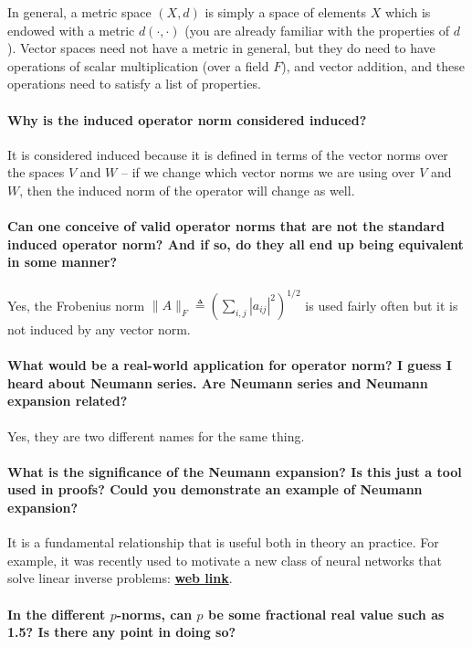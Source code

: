 \documentclass[10pt,english]{article}
\begin{document}
In general, a metric space $(X,d)$ is simply a space of elements $X$ which is endowed with a metric $d(\cdot,\cdot)$ (you are already familiar with the properties of $d$).  Vector spaces need not have a metric in general, but they do need to have operations of scalar multiplication (over a field $F$), and vector addition, and these operations need to satisfy a list of properties.

\paragraph{Why is the induced operator norm considered induced?}
It is considered induced because it is defined in terms of the vector norms over the spaces $V$ and $W$ -- if we change which vector norms we are using over $V$ and $W$, then the induced norm of the operator will change as well.


\paragraph{Can one conceive of valid operator norms that are not the standard induced operator norm? And if so, do they all end up being equivalent in some manner?}

Yes, the Frobenius norm $\| A \|_F \triangleq \left( \sum_{i,j} |a_{ij}|^2 \right)^{1/2}$ is used fairly often but it is not induced by any vector norm.

\paragraph{What would be a real-world application for operator norm? I guess I heard about Neumann series. Are Neumann series and Neumann expansion related?}

Yes, they are two different names for the same thing.

\paragraph{What is the significance of the Neumann expansion? Is this just a tool used in proofs? Could you demonstrate an example of Neumann expansion?}

It is a fundamental relationship that is useful both in theory an practice.
For example, it was recently used to motivate a new class of neural networks that solve linear inverse problems: \href{https://arxiv.org/pdf/1901.03707.pdf}{\textbf{web link}}.

\paragraph{In the different $p$-norms, can $p$ be some fractional real value such as 1.5? Is there any point in doing so?}
\end{document}

